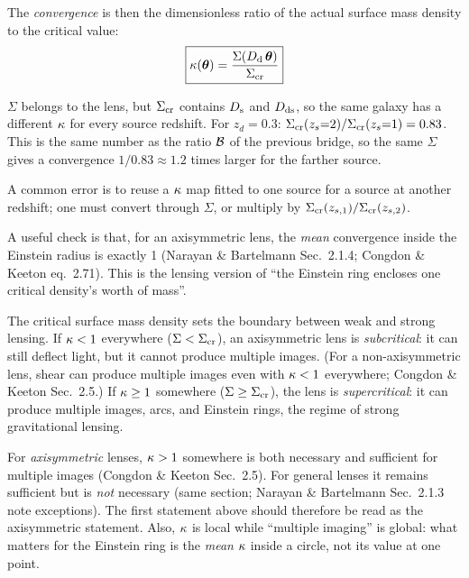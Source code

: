 The \emph{convergence} is then the dimensionless ratio of the actual
surface mass density to the critical value:
\begin{equation}
    \boxed{
    \kappa(\boldsymbol{\theta}) = \frac{\Sigma(D_{\mathrm{d}}\,\boldsymbol{\theta})}{\Sigma_{\mathrm{cr}}}
    }
    \label{eq:convergence_def}
\end{equation}
\begin{annotation}
$\Sigma$ belongs to the lens, but $\Sigma_{\mathrm{cr}}$ contains $D_{\mathrm{s}}$ and $D_{\mathrm{ds}}$, so the
same galaxy has a different $\kappa$ for every source redshift. For
$z_d = 0.3$: $\Sigma_{\mathrm{cr}}(z_s{=}2)/\Sigma_{\mathrm{cr}}(z_s{=}1) = 0.83$. This is the same
number as the ratio $\mathcal{B}$ of the previous bridge, so the same $\Sigma$ gives a
convergence $1/0.83 \approx 1.2$ times larger for the farther source.

A common error is to reuse a $\kappa$ map fitted to one source for a
source at another redshift; one must convert through $\Sigma$, or multiply by
$\Sigma_{\mathrm{cr}}(z_{s,1})/\Sigma_{\mathrm{cr}}(z_{s,2})$.

A useful check is that, for an axisymmetric lens, the \emph{mean}
convergence inside the Einstein radius is exactly 1
(Narayan \& Bartelmann Sec.~2.1.4; Congdon \& Keeton eq.~2.71). This is the
lensing version of ``the Einstein ring encloses one critical density's worth
of mass''.
\end{annotation}

The critical surface mass density sets the boundary between weak and
strong lensing.  If $\kappa < 1$ everywhere ($\Sigma < \Sigma_{\mathrm{cr}}$), an
axisymmetric lens is \emph{subcritical}: it can still deflect light, but
it cannot produce multiple images.  (For a non-axisymmetric lens, shear
can produce multiple images even with $\kappa < 1$ everywhere; Congdon
\& Keeton Sec.~2.5.)  If $\kappa \geq 1$ somewhere
($\Sigma \geq \Sigma_{\mathrm{cr}}$), the lens is \emph{supercritical}: it can
produce multiple images, arcs, and Einstein rings, the regime of strong
gravitational lensing.
\begin{annotation}[How sharp is the $\kappab = 1$ boundary?]
For \emph{axisymmetric} lenses, $\kappa > 1$ somewhere is both necessary and
sufficient for multiple images (Congdon \& Keeton Sec.~2.5). For general
lenses it remains sufficient but is \emph{not} necessary (same section;
Narayan \& Bartelmann Sec.~2.1.3 note exceptions). The first statement above should
therefore be read as the axisymmetric statement. Also, $\kappa$ is
local while ``multiple imaging'' is global: what matters for the Einstein
ring is the \emph{mean} $\kappa$ inside a circle, not its value at one point.
\end{annotation}

